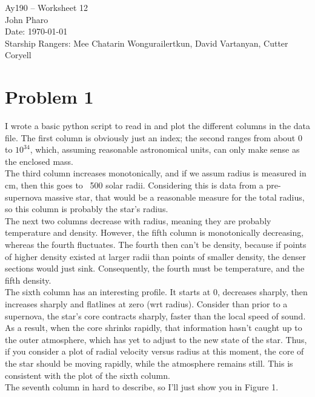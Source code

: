 \documentclass[11pt,letterpaper]{article}
\begin{document}
\begin{center}
\Large
Ay190 -- Worksheet 12\\
John Pharo\\
Date: \today\\
Starship Rangers: Mee Chatarin Wongurailertkun, David Vartanyan, Cutter Coryell
\end{center}

\section{Problem 1}

I wrote a basic python script to read in and plot the different columns in the data file. The first column is obviously just an index; the second ranges from about 0 to $10^{34}$, which, assuming reasonable astronomical units, can only make sense as the enclosed mass. \\

The third column increases monotonically, and if we assum radius is measured in cm, then this goes to ~500 solar radii. Considering this is data from a pre-supernova massive star, that would be a reasonable measure for the total radius, so this column is probably the star's radius. \\

The next two columns decrease with radius, meaning they are probably temperature and density. However, the fifth column is monotonically decreasing, whereas the fourth fluctuates. The fourth then can't be density, because if points of higher density existed at larger radii than points of smaller density, the denser sections would just sink. Consequently, the fourth must be temperature, and the fifth density. \\

The sixth column has an interesting profile. It starts at 0, decreases sharply, then increases sharply and flatlines at zero (wrt radius). Consider than prior to a supernova, the star's core contracts sharply, faster than the local speed of sound. As a result, when the core shrinks rapidly, that information hasn't caught up to the outer atmosphere, which has yet to adjust to the new state of the star. Thus, if you consider a plot of radial velocity versus radius at this moment, the core of the star should be moving rapidly, while the atmosphere remains still. This is consistent with the plot of the sixth column. \\

The seventh column in hard to describe, so I'll just show you in Figure 1. \\
\end{document}
